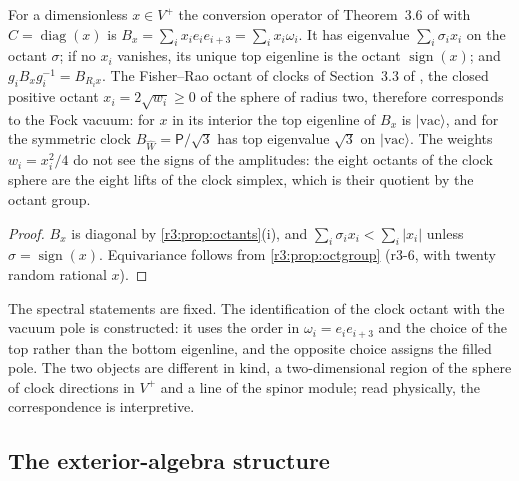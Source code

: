 \begin{proposition}
\label{r3:prop:clock}
For a dimensionless $x\in V^+$ the conversion operator of Theorem~3.6 of \cite{ES17} with $C=\operatorname{diag}(x)$ is
$B_x=\sum_ix_ie_ie_{i+3}=\sum_ix_i\omega_i$. It has eigenvalue $\sum_i\sigma_ix_i$ on the octant $\sigma$; if no $x_i$ vanishes, its unique top
eigenline is the octant $\operatorname{sign}(x)$; and $g_iB_xg_i^{-1}=B_{R_ix}$. The Fisher--Rao octant of clocks of Section~3.3 of \cite{ES17},
the closed positive octant $x_i=2\sqrt{w_i}\ge0$ of the sphere of radius two, therefore corresponds to the Fock vacuum: for $x$ in its
interior the top eigenline of $B_x$ is $|\mathrm{vac}\rangle$, and for the symmetric clock $B_{\widehat W}=\mathsf P/\sqrt3$ has top eigenvalue
$\sqrt3$ on $|\mathrm{vac}\rangle$. The weights $w_i=x_i^2/4$ do not see the signs of the amplitudes: the eight octants of the clock sphere are
the eight lifts of the clock simplex, which is their quotient by the octant group.
\end{proposition}

\begin{proof}
$B_x$ is diagonal by \cref{r3:prop:octants}(i), and $\sum_i\sigma_ix_i<\sum_i|x_i|$ unless $\sigma=\operatorname{sign}(x)$. Equivariance follows
from \cref{r3:prop:octgroup} (r3-6, with twenty random rational $x$).
\end{proof}

The spectral statements are fixed. The identification of the clock octant with the vacuum pole is constructed: it uses the order in
$\omega_i=e_ie_{i+3}$ and the choice of the top rather than the bottom eigenline, and the opposite choice assigns the filled pole. The two
objects are different in kind, a two-dimensional region of the sphere of clock directions in $V^+$ and a line of the spinor module; read
physically, the correspondence is interpretive.

\subsection{The exterior-algebra structure}
\label{r3:sec:exterior}

